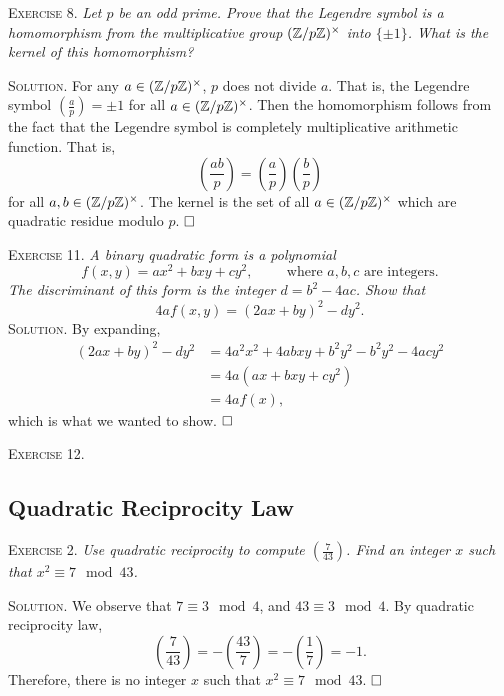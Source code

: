 \documentclass[11pt, leqno]{article}
\newcommand{\done}{\ensuremath{\hfill\square}}
\begin{document}
\textsc{Exercise 8}. \emph{Let $p$ be an odd prime. Prove that the Legendre symbol is a homomorphism from the multiplicative group $(\mathbb{Z}/p\mathbb{Z})^{\times}$ into $\{\pm 1\}$. What is the kernel of this homomorphism?}

\textsc{Solution}. For any $a\in (\mathbb{Z}/p\mathbb{Z})^{\times}$, $p$ does not divide $a$. That is, the Legendre symbol $\left( \frac{a}{p} \right) = \pm 1$ for all $a\in (\mathbb{Z}/p\mathbb{Z})^{\times}$. Then the homomorphism follows from the fact that the Legendre symbol is completely multiplicative arithmetic function. That is, 
\begin{displaymath}
\left( \frac{ab}{p} \right) = \left( \frac{a}{p} \right) \left( \frac{b}{p} \right)
\end{displaymath}
for all $a,b \in (\mathbb{Z}/p\mathbb{Z})^{\times}$. The kernel is the set of all $a\in (\mathbb{Z}/p\mathbb{Z})^{\times}$ which are quadratic residue modulo $p$. \done

\textsc{Exercise 11}. \emph{A binary quadratic form is a polynomial 
\begin{displaymath}
f(x,y) = ax^2 + bxy + cy^2, \hspace{1cm} \text{where $a, b, c$ are integers.}
\end{displaymath}
The discriminant of this form is the integer $d = b^2 - 4ac$. Show that 
\begin{displaymath}
4af(x,y) = (2ax + by)^2 - dy^2.
\end{displaymath}}\textsc{Solution}. By expanding, 
\begin{align*}
  (2ax + by)^2 - dy^2 &= 4a^2x^2 + 4abxy + b^2y^2 - b^2y^2 - 4acy^2 \\
                      &= 4a(ax + bxy + cy^2) \\
                      &= 4af(x),
\end{align*}
which is what we wanted to show. \done

\textsc{Exercise 12.} \emph{}

\subsection{Quadratic Reciprocity Law}

\textsc{Exercise 2}. \emph{Use quadratic reciprocity to compute $\left( \frac{7}{43} \right)$. Find an integer $x$ such that $x^2 \equiv 7 \mod 43$.}

\textsc{Solution}. We observe that $7 \equiv 3 \mod 4$, and $43 \equiv 3 \mod 4$. By quadratic reciprocity law, 
\begin{displaymath}
\left( \frac{7}{43} \right) = -\left( \frac{43}{7} \right) = -\left( \frac{1}{7} \right) = -1.
\end{displaymath}
Therefore, there is no integer $x$ such that $x^2 \equiv 7 \mod 43$. \done
\end{document}
